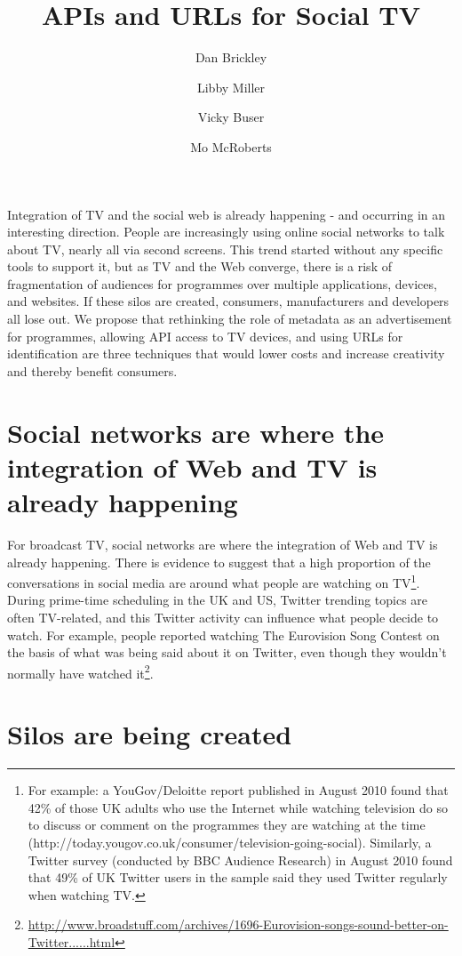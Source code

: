 \documentclass[]{article}%
\date{}
\title{APIs and URLs for Social TV}
\author{Dan Brickley}
\affil{Vrij Universiteit, Amsterdam; NoTube Project}
\author{Libby Miller}
\author{Vicky Buser}
\affil{BBC R\&D; NoTube Project}
\author{Mo McRoberts}
\affil{Project Baird}
\begin{document}
\ifpdf
{}
\else
{}
\fi

\maketitle
Integration of TV and the social web is already happening - and occurring in an interesting direction. People are increasingly using online social networks to talk about TV, nearly all via second screens. This trend started without any specific tools to support it, but as TV and the Web converge, there is a risk of fragmentation of audiences for programmes over multiple applications, devices, and websites. If these silos are created, consumers, manufacturers and developers all lose out. We propose that rethinking the role of metadata as an advertisement for programmes, allowing API access to TV devices, and using URLs for identification are three techniques that would lower costs and increase creativity and thereby benefit consumers.

\section{Social networks are where the integration of Web and TV is already happening}

For broadcast TV, social networks are where the integration of Web and TV is already happening. There is evidence to suggest that a high proportion of the conversations in social media are around what people are watching on TV\footnote{For example: a YouGov/Deloitte report published in August 2010 found that 42\% of those UK adults who use the Internet while watching television do so to discuss or comment on the programmes they are watching at the time (http://today.yougov.co.uk/consumer/television-going-social). Similarly, a Twitter survey (conducted by BBC Audience Research) in August 2010 found that 49\% of UK Twitter users in the sample said they used Twitter regularly when watching TV.}. During prime-time scheduling in the UK and US, Twitter trending topics are often TV-related, and this Twitter activity can influence what people decide to watch. For example, people reported watching The Eurovision Song Contest on the basis of what was being said about it on Twitter, even though they wouldn't normally have watched it\footnote{\url{http://www.broadstuff.com/archives/1696-Eurovision-songs-sound-better-on-Twitter......html}}. 


\section{Silos are being created}
\end{document}
